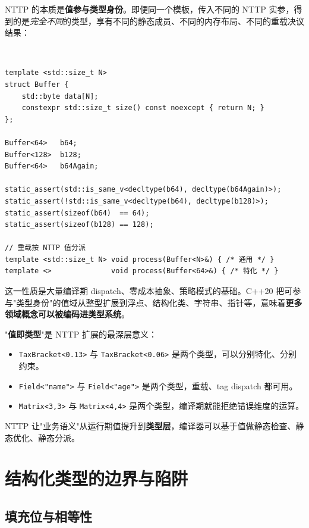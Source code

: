 \documentclass[12pt,a4paper,fontset=fandol]{ctexbook}
\newcommand{\cpplabel}{%
  \tcbox[on line,colback=cppheadbg,colframe=cppheadbg,
    boxrule=0pt,arc=1pt,left=2pt,right=2pt,top=1pt,bottom=1pt,
    colupper=white,fontupper=\scriptsize\bfseries]{C++}}
\newcommand{\cpp}[1]{C++#1}
\newcommand{\kw}[1]{\texttt{#1}}
\begin{document}
NTTP 的本质是\textbf{值参与类型身份}。即便同一个模板，传入不同的 NTTP 实参，得到的是\emph{完全不同}的类型，享有不同的静态成员、不同的内存布局、不同的重载决议结果：

\cpplabel\ \begin{lstlisting}
template <std::size_t N>
struct Buffer {
    std::byte data[N];
    constexpr std::size_t size() const noexcept { return N; }
};

Buffer<64>   b64;
Buffer<128>  b128;
Buffer<64>   b64Again;

static_assert(std::is_same_v<decltype(b64), decltype(b64Again)>);
static_assert(!std::is_same_v<decltype(b64), decltype(b128)>);
static_assert(sizeof(b64)  == 64);
static_assert(sizeof(b128) == 128);

// 重载按 NTTP 值分派
template <std::size_t N> void process(Buffer<N>&) { /* 通用 */ }
template <>              void process(Buffer<64>&) { /* 特化 */ }
\end{lstlisting}

这一性质是大量编译期 dispatch、零成本抽象、策略模式的基础。\cpp{20} 把可参与"类型身份"的值域从整型扩展到浮点、结构化类、字符串、指针等，意味着\textbf{更多领域概念可以被编码进类型系统}。

\begin{guideline}
"\textbf{值即类型}"是 NTTP 扩展的最深层意义：

\begin{itemize}
  \item \kw{TaxBracket<0.13>} 与 \kw{TaxBracket<0.06>} 是两个类型，可以分别特化、分别约束。
  \item \kw{Field<"name">} 与 \kw{Field<"age">} 是两个类型，重载、tag dispatch 都可用。
  \item \kw{Matrix<3,3>} 与 \kw{Matrix<4,4>} 是两个类型，编译期就能拒绝错误维度的运算。
\end{itemize}

NTTP 让"业务语义"从运行期值提升到\textbf{类型层}，编译器可以基于值做静态检查、静态优化、静态分派。
\end{guideline}

\chapter{结构化类型的边界与陷阱}

\section{填充位与相等性}
\end{document}
